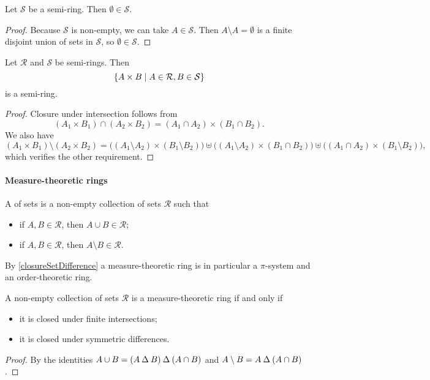\begin{lemma} \label{emptysetElementSemiring}
Let $\mathcal{S}$ be a semi-ring. Then $\emptyset \in \mathcal{S}$.
\end{lemma}
\begin{proof}
Because $\mathcal{S}$ is non-empty, we can take $A\in \mathcal{S}$. Then $A\setminus A = \emptyset$ is a finite disjoint union of sets in $\mathcal{S}$, so $\emptyset \in \mathcal{S}$.
\end{proof}

\begin{proposition} \label{productSemiring}
Let $\mathcal{R}$ and $\mathcal{S}$ be semi-rings. Then
\[ \setbuilder{A\times B}{A\in\mathcal{R}, B\in\mathcal{S}} \]
is a semi-ring.
\end{proposition}
\begin{proof}
Closure under intersection follows from
\[ (A_1\times B_1) \cap (A_2\times B_2) = (A_1\cap A_2)\times(B_1\cap B_2). \]
We also have
\[ (A_1\times B_1) \setminus (A_2\times B_2) = \big((A_1\setminus A_2)\times(B_1\setminus B_2)\big) \uplus \big((A_1\setminus A_2)\times(B_1\cap B_2)\big) \uplus \big((A_1\cap A_2)\times(B_1\setminus B_2)\big), \]
which verifies the other requirement.
\end{proof}

\paragraph{Measure-theoretic rings}
\begin{definition}
A  of sets is a non-empty collection of sets $\mathcal{R}$ such that
\begin{itemize}
\item if $A,B\in \mathcal{R}$, then $A\cup B\in \mathcal{R}$;
\item if $A,B\in \mathcal{R}$, then $A\setminus B\in \mathcal{R}$.
\end{itemize}
\end{definition}
By \ref{closureSetDifference} a measure-theoretic ring is in particular a $\pi$-system and an order-theoretic ring.

\begin{lemma}
A non-empty collection of sets $\mathcal{R}$ is a measure-theoretic ring \textup{if and only if}
\begin{itemize}
\item it is closed under finite intersections;
\item it is closed under symmetric differences.
\end{itemize}
\end{lemma}
\begin{proof}
By the identities $A\cup B = (A\mathbin{\Delta} B)\mathbin{\Delta} (A\cap B)$ and $A\setminus B = A\mathbin{\Delta} (A\cap B)$.
\end{proof}

